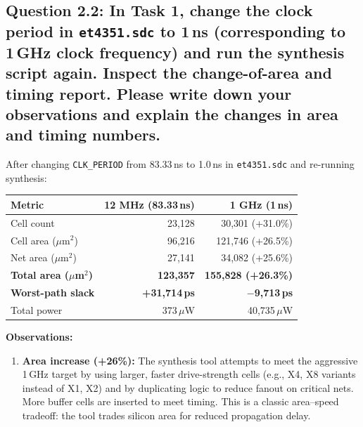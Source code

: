 \documentclass{article}
\begin{document}
\newpage

\subsection*{Question 2.2: In Task 1, change the clock period in \texttt{et4351.sdc} to 1\,ns (corresponding to 1\,GHz clock frequency) and run the synthesis script again. Inspect the change-of-area and timing report. Please write down your observations and explain the changes in area and timing numbers.}

\begin{tcolorbox}[colback=white, colframe=black, width=\textwidth, title=Answer 2.2]

After changing \texttt{CLK\_PERIOD} from 83.33\,ns to 1.0\,ns in \texttt{et4351.sdc} and re-running synthesis:

\vspace{0.2cm}

\begin{tabular}{@{}lrr@{}}
\toprule
\textbf{Metric} & \textbf{12 MHz (83.33\,ns)} & \textbf{1 GHz (1\,ns)} \\
\midrule
Cell count & 23{,}128 & 30{,}301 (+31.0\%) \\
Cell area ($\mu$m$^2$) & 96{,}216 & 121{,}746 (+26.5\%) \\
Net area ($\mu$m$^2$) & 27{,}141 & 34{,}082 (+25.6\%) \\
\textbf{Total area ($\mu$m$^2$)} & \textbf{123{,}357} & \textbf{155{,}828 (+26.3\%)} \\
\midrule
\textbf{Worst-path slack} & \textbf{+31{,}714\,ps} & \textbf{$-$9{,}713\,ps} \\
Total power & 373\,$\mu$W & 40{,}735\,$\mu$W \\
\bottomrule
\end{tabular}

\vspace{0.3cm}

\textbf{Observations:}

\begin{enumerate}
\item \textbf{Area increase (+26\%):} The synthesis tool attempts to meet the aggressive 1\,GHz target by using larger, faster drive-strength cells (e.g., X4, X8 variants instead of X1, X2) and by duplicating logic to reduce fanout on critical nets. More buffer cells are inserted to meet timing. This is a classic area--speed tradeoff: the tool trades silicon area for reduced propagation delay.


\end{enumerate}
\end{tcolorbox}
\end{document}
